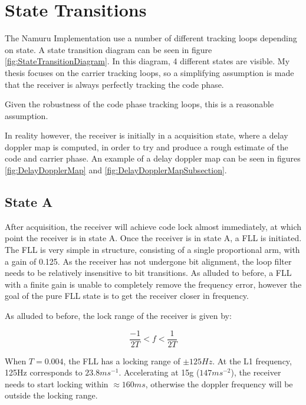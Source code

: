 \label{ch:StateTransitions}
\chapter{State Transitions}



The Namuru Implementation use a number of different tracking loops depending on state. A state transition diagram can be seen in figure \ref{fig:StateTransitionDiagram}. In this diagram, 4 different states are visible. My thesis focuses on the carrier tracking loops, so a simplifying assumption is made that the receiver is always perfectly tracking the code phase. 

Given the robustness of the code phase tracking loops, this is a reasonable assumption.

In reality however, the receiver is initially in a acquisition state, where a delay doppler map is computed, in order to try and produce a rough estimate of the code and carrier phase.  An example of a delay doppler map can be seen in figures \ref{fig:DelayDopplerMap} and \ref{fig:DelayDopplerMapSubsection}.


\section{State A}
After acquisition, the receiver will achieve code lock almost immediately, at which point the receiver is in state A. Once the receiver is in state A, a FLL is initiated. The FLL is very simple in structure, consisting of a single proportional arm, with a gain of 0.125. As the receiver has not undergone bit alignment, the loop filter needs to be relatively insensitive to bit transitions. As alluded to before, a FLL with a finite gain is unable to completely remove the frequency error, however the goal of the pure FLL state is to get the receiver closer in frequency.

As alluded to before, the lock range of the receiver is given by:

\begin{equation}
\frac{-1}{2T} < f < \frac{1}{2T}
\end{equation}

When $T = 0.004$, the FLL has a locking range of $\pm 125Hz$. At the L1 frequency, 125Hz corresponds to $23.8ms^{-1}$. Accelerating at 15g ($147ms^{-2}$), the receiver needs to start locking within $\approx 160ms$, otherwise the doppler frequency will be outside the locking range.

